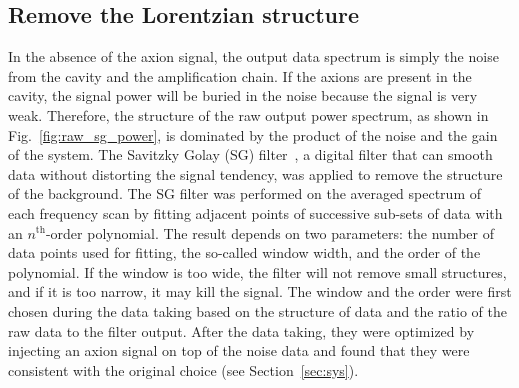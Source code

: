 

\subsection{Remove the Lorentzian structure}

In the absence of the axion signal, the output data spectrum is simply the 
noise from the cavity and the amplification chain. If the axions are present 
in the cavity, the signal power will be buried in the noise because the 
signal is very weak. Therefore, the structure of the raw output power 
spectrum, as shown in Fig.~\ref{fig:raw_sg_power}, is dominated by 
the product of the noise and the gain of the system. The Savitzky Golay (SG) 
filter~\cite{SGFilter}, a digital filter that can smooth data without 
distorting the signal tendency, was applied to remove the structure of the  
background. The SG filter was performed on the averaged spectrum of each 
frequency scan by fitting adjacent points of successive sub-sets of data with 
an $n^\text{th}$-order polynomial. The result depends on two parameters: 
the number of 
data points used for fitting, the so-called window width, and the order of 
the polynomial. If the window is too wide, the filter will not remove small 
structures, and if it is too narrow, it may kill the signal. 
The window and the order were first chosen during the data taking based on 
the structure of data and the ratio of the raw data to the filter output. 
After the data taking, they were optimized by injecting an axion signal on top of 
the noise data and found that they were consistent with the original choice 
(see Section~\ref{sec:sys}). 


